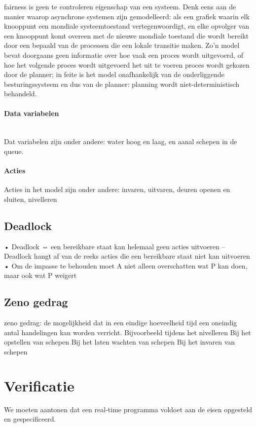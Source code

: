 \documentclass{article}
\begin{document}
	fairness   is geen te controleren eigenschap van een systeem. Denk eens aan de manier waarop asynchrone systemen zijn
	gemodelleerd: als een grafiek waarin elk knooppunt een mondiale systeemtoestand vertegenwoordigt, en elke opvolger van een knooppunt
	komt overeen met de nieuwe mondiale toestand die wordt bereikt door een bepaald van de processen die een lokale transitie maken.
	Zo’n model bevat doorgaans geen informatie over hoe vaak een proces wordt uitgevoerd, of hoe het volgende proces wordt uitgevoerd
	het uit te voeren proces wordt gekozen door de planner; in feite is het model onafhankelijk van de onderliggende
	besturingssysteem en dus van de planner: planning wordt niet-deterministisch behandeld.
	\cite{WahlFairness}
	
	
	
	
	\paragraph{Data variabelen} \\
	Dat variabelen zijn onder andere: water hoog  en laag, en aanal schepen in de queue.
	\paragraph{Acties}
	Acties in het model zijn onder andere: invaren, uitvaren, deuren openen en sluiten, nivelleren
	
	
	
	
	\subsection{Deadlock}
	• Deadlock ⇔ een bereikbare staat kan helemaal geen acties uitvoeren – Deadlock hangt af van de reeks acties die een bereikbare staat niet kan uitvoeren • Om de impasse te behouden moet A niet alleen overschatten wat P kan doen, maar ook wat P weigert
	\subsection{Zeno gedrag}
	zeno gedrag: de mogelijkheid dat in een eindige hoeveelheid tijd een oneindig antal handelingen kan worden verricht.
	Bijvoorbeeld tijdens het nivelleren
	Bij het opstellen van schepen
	Bij het laten wachten van schepen
	Bij het invaren van schepen
	
	
	
	\section{Verificatie}
	We moeten aantonen dat een real-time programma voldoet aan de eisen opgesteld en gespecificeerd. 
	
\end{document}
